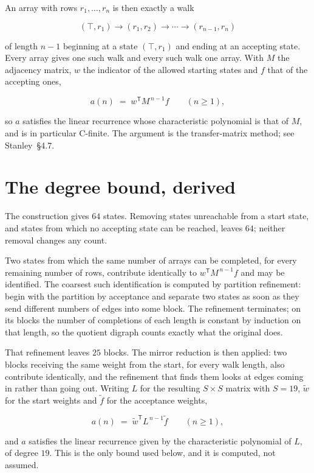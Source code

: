 \documentclass[11pt]{article}
\theoremstyle{definition}
\begin{document}
An array with rows $r_1,\dots,r_n$ is then exactly a walk

\[(\top,r_1) \to (r_1,r_2) \to \cdots \to (r_{n-1},r_n)\]

of length $n-1$ beginning at a state $(\top,r_1)$ and ending at an accepting state. Every array gives one such walk and every such walk one array. With $M$ the adjacency matrix, $w$ the indicator of the allowed starting states and $f$ that of the accepting ones,

\[a(n) \;=\; w^{\mathsf T} M^{\,n-1} f \qquad (n \ge 1),\]

so $a$ satisfies the linear recurrence whose characteristic polynomial is that of $M$, and is in particular C-finite. The argument is the transfer-matrix method; see Stanley~\S4.7.

\section{The degree bound, derived}

The construction gives $64$ states. Removing states unreachable from a start state, and states from which no accepting state can be reached, leaves $64$; neither removal changes any count.

Two states from which the same number of arrays can be completed, for every remaining number of rows, contribute identically to $w^{\mathsf T}M^{\,n-1}f$ and may be identified. The coarsest such identification is computed by partition refinement: begin with the partition by acceptance and separate two states as soon as they send different numbers of edges into some block. The refinement terminates; on its blocks the number of completions of each length is constant by induction on that length, so the quotient digraph counts exactly what the original does.

That refinement leaves $25$ blocks. The mirror reduction is then applied: two blocks receiving the same weight from the start, for every walk length, also contribute identically, and the refinement that finds them looks at edges coming in rather than going out. Writing $L$ for the resulting $S \times S$ matrix with $S = 19$, $\tilde w$ for the start weights and $\tilde f$ for the acceptance weights,

\[a(n) \;=\; \tilde w^{\mathsf T} L^{\,n-1} \tilde f \qquad (n \ge 1),\]

and $a$ satisfies the linear recurrence given by the characteristic polynomial of $L$, of degree $19$. This is the only bound used below, and it is computed, not assumed.
\end{document}
